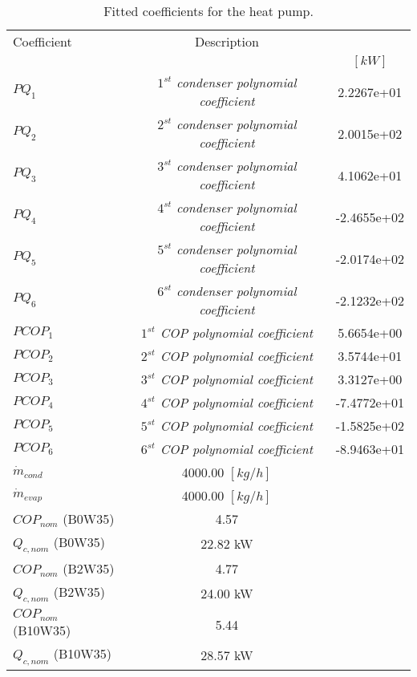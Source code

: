 \documentclass[english]{SPFShortReport}
\author{Dani Carbonell}
\begin{document}
\begin{table}[!ht]
\begin{small}
\caption{Fitted coefficients for the heat pump.}
\begin{center}
\resizebox{12cm}{!} 
{
\begin{tabular}{l | c c } 
\hline
\hline
Coefficient &Description & \\ 
 & &$[kW]$\\ 
\hline
$PQ_{1}$ & \emph{$1^{st}$ condenser polynomial coefficient}  & 2.2267e+01    \\ 
$PQ_{2}$ & \emph{$2^{st}$ condenser polynomial coefficient}  & 2.0015e+02    \\ 
$PQ_{3}$ & \emph{$3^{st}$ condenser polynomial coefficient}  & 4.1062e+01    \\ 
$PQ_{4}$ & \emph{$4^{st}$ condenser polynomial coefficient}  & -2.4655e+02    \\ 
$PQ_{5}$ & \emph{$5^{st}$ condenser polynomial coefficient}  & -2.0174e+02    \\ 
$PQ_{6}$ & \emph{$6^{st}$ condenser polynomial coefficient}  & -2.1232e+02    \\ 
\hline
$PCOP_{1}$ & \emph{$1^{st}$ COP polynomial coefficient}  & 5.6654e+00    \\ 
$PCOP_{2}$ & \emph{$2^{st}$ COP polynomial coefficient}  & 3.5744e+01    \\ 
$PCOP_{3}$ & \emph{$3^{st}$ COP polynomial coefficient}  & 3.3127e+00    \\ 
$PCOP_{4}$ & \emph{$4^{st}$ COP polynomial coefficient}  & -7.4772e+01    \\ 
$PCOP_{5}$ & \emph{$5^{st}$ COP polynomial coefficient}  & -1.5825e+02    \\ 
$PCOP_{6}$ & \emph{$6^{st}$ COP polynomial coefficient}  & -8.9463e+01    \\ 
\hline
$\dot m_{cond}$ & 4000.00 $[kg/h]$\\ 
$\dot m_{evap}$ & 4000.00 $[kg/h]$\\ 
\hline
$COP_{nom}$ (B0W35)& 4.57 \\ 
$Q_{c,nom}$ (B0W35)& 22.82 kW\\ 
$COP_{nom}$ (B2W35)& 4.77 \\ 
$Q_{c,nom}$ (B2W35)& 24.00 kW\\ 
$COP_{nom}$ (B10W35)& 5.44 \\ 
$Q_{c,nom}$ (B10W35)& 28.57 kW\\ 
\hline
\hline
\end{tabular}
}
\label{CoefTable}
\end{center}
\end{small}
\end{table}
\end{document}
